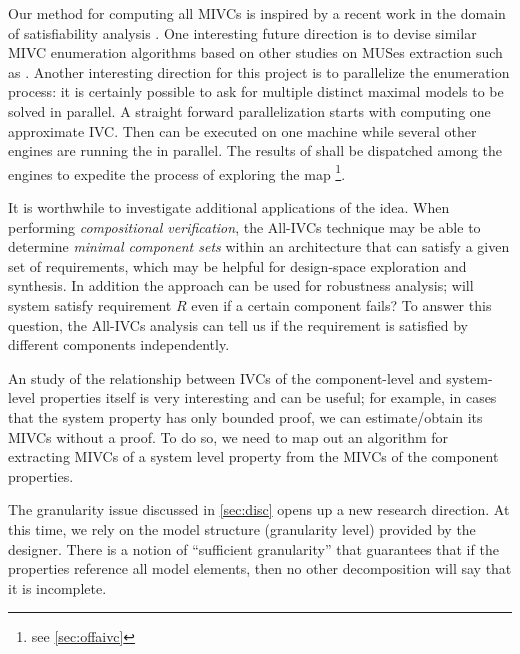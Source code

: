 
Our method for computing all MIVCs is inspired by a recent work in the domain of satisfiability analysis \cite{marco2016fast}. One interesting future direction is to devise similar MIVC enumeration algorithms based on other studies on MUSes extraction such as \cite{nadel2014accelerated}.
Another interesting direction for this project is to parallelize the enumeration process: it is certainly possible to ask for multiple distinct maximal models to be solved in parallel. 
A straight forward parallelization starts with computing one approximate IVC. Then \mustalg can be executed on one machine while several other engines are running the \aivcalg in parallel. The results of \mustalg shall be dispatched among the engines to expedite the process of exploring the map \footnote{see \ref{sec:offaivc}}.

It is worthwhile to investigate additional applications of the idea.  When performing {\em compositional verification}, the All-IVCs technique may be able to determine {\em minimal component sets} within an architecture that can satisfy a given set of requirements, which may be helpful for design-space exploration and synthesis. In addition the approach can be used for robustness analysis; will system satisfy requirement $R$ even if a certain component fails? To answer this question, the All-IVCs analysis can tell us if the requirement is satisfied by different components independently. 


An study of the relationship between IVCs of the component-level and system-level properties itself is very interesting and can be useful; for example, in cases that the system property has only bounded proof, we can estimate/obtain its MIVCs without a proof. To do so, we need to map out an algorithm for extracting MIVCs of a system level property from the MIVCs of the component properties.

The granularity issue discussed in \ref{sec:disc} opens up a new research direction. At this time, we rely on the model structure (granularity level) provided by the designer. There is a notion of ``sufficient granularity'' that guarantees that if the properties reference all model elements, then no other decomposition will say that it is incomplete.

